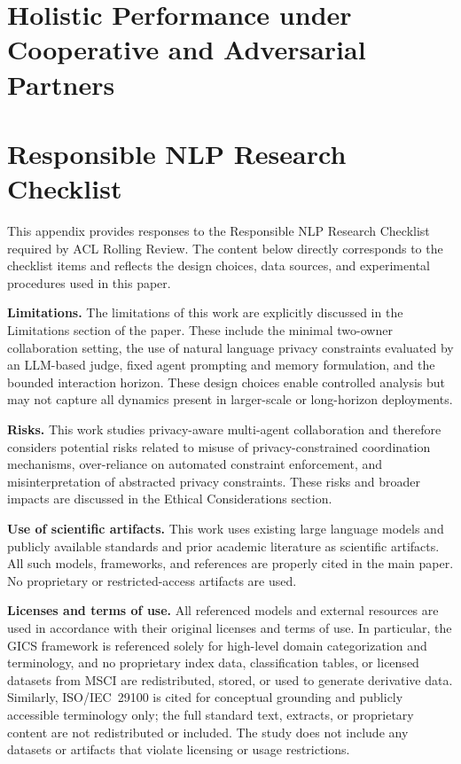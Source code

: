 \section{Holistic Performance under Cooperative and Adversarial Partners}
\label{app:holistic_partner_results}




\section{Responsible NLP Research Checklist}

This appendix provides responses to the Responsible NLP Research Checklist required by ACL Rolling Review. The content below directly corresponds to the checklist items and reflects the design choices, data sources, and experimental procedures used in this paper.

\medskip
\noindent
\textbf{Limitations.}
The limitations of this work are explicitly discussed in the Limitations section of the paper. These include the minimal two-owner collaboration setting, the use of natural language privacy constraints evaluated by an LLM-based judge, fixed agent prompting and memory formulation, and the bounded interaction horizon. These design choices enable controlled analysis but may not capture all dynamics present in larger-scale or long-horizon deployments.

\medskip
\noindent
\textbf{Risks.}
This work studies privacy-aware multi-agent collaboration and therefore considers potential risks related to misuse of privacy-constrained coordination mechanisms, over-reliance on automated constraint enforcement, and misinterpretation of abstracted privacy constraints. These risks and broader impacts are discussed in the Ethical Considerations section.

\medskip
\noindent
\textbf{Use of scientific artifacts.}
This work uses existing large language models and publicly available standards and prior academic literature as scientific artifacts. All such models, frameworks, and references are properly cited in the main paper. No proprietary or restricted-access artifacts are used.

\medskip
\noindent
\textbf{Licenses and terms of use.}
All referenced models and external resources are used in accordance with their original licenses and terms of use. 
In particular, the GICS\textregistered{} framework is referenced solely for high-level domain categorization and terminology, and no proprietary index data, classification tables, or licensed datasets from MSCI are redistributed, stored, or used to generate derivative data. 
Similarly, ISO/IEC~29100 is cited for conceptual grounding and publicly accessible terminology only; the full standard text, extracts, or proprietary content are not redistributed or included. 
The study does not include any datasets or artifacts that violate licensing or usage restrictions.


